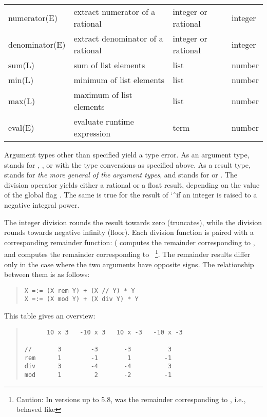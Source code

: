 {\begin{tabular}{l l l l}
numerator(E)   & extract numerator of a  rational & integer or rational &
                 integer \\
denominator(E)   & extract denominator of a rational & integer or rational &
                   integer \\
sum(L)   & sum of list elements & list & number \\
min(L)   & minimum of list elements & list & number \\
max(L)   & maximum of list elements & list & number \\
eval(E)   & evaluate runtime expression & term & number \\
\end{tabular}
}
\vspace{2mm}
\vfill       %
\pagebreak   %

\noindent
Argument types other than specified yield a type error.
As an argument type,  stands for ,
,  or  with the type conversions as
specified above.
As a result type,  stands for
\emph{the more general of the argument types}, and  stands for
 or .
The division operator \notation{/} yields either a rational or a float result,
depending on the value of the global flag
.%
The same is true for the result of \char`\^\ if an integer is raised to
a negative integral power.

The integer division \notation{//} rounds the result towards zero (truncates),
while the  division rounds towards negative infinity (floor).
Each division function is paired with a corresponding remainder function:
( computes the remainder corresponding to \notation{//}, and
computes the remainder corresponding to \
\footnote{%
  Caution: In {\eclipse} versions up to 5.8,  was the
  remainder corresponding to \notation{//}, i.e., behaved like }.
The remainder results differ only in the case where the two arguments
have opposite signs.  The relationship between them is as follows:
\begin{quote}
\begin{verbatim}
X =:= (X rem Y) + (X // Y) * Y
X =:= (X mod Y) + (X div Y) * Y
\end{verbatim}
\end{quote}
This table gives an overview:
\begin{quote}
\begin{verbatim}
      10 x 3   -10 x 3   10 x -3   -10 x -3

//       3        -3       -3          3
rem      1        -1        1         -1
div      3        -4       -4          3
mod      1         2       -2         -1
\end{verbatim}
\end{quote}

